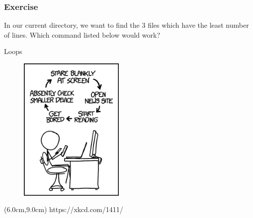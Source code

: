 \documentclass{beamer}
\begin{document}
\begin{frame}
\frametitle{Exercise}
In our current directory, we want to find the 3 files which have the least number of lines. Which command listed below would work?

\end{frame}



\begin{frame}{Loops}

\begin{figure}[htbp]
   \centering
   \includegraphics[width=0.45\textwidth]{figs_slides/loops.png} 
\end{figure}

\begin{textblock*}{7cm}(6.0cm,9.0cm)
		\centering
			\tiny{https://xkcd.com/1411/ }
\end{textblock*}

\end{frame}
\end{document}
